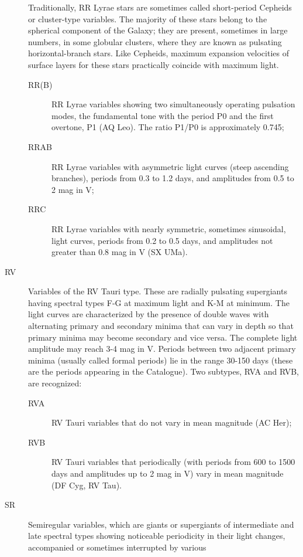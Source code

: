 \begin{description}
				Traditionally, RR Lyrae stars are sometimes called short-period Cepheids
				or cluster-type variables. The majority of these stars belong to the
				spherical component of the Galaxy; they are present, sometimes in large
				numbers, in some globular clusters, where they are known as pulsating
				horizontal-branch stars. Like Cepheids, maximum expansion velocities of
				surface layers for these stars practically coincide with maximum
				light.
	\begin{description}
\item[RR(B)] 	RR Lyrae variables showing two simultaneously operating
				pulsation modes, the fundamental tone with the period P0 and the first
				overtone, P1 (AQ Leo). The ratio P1/P0 is approximately 0.745;
\item[RRAB] 	RR Lyrae variables with asymmetric light curves (steep
				ascending branches), periods from 0.3 to 1.2 days, and amplitudes from
				0.5 to 2 mag in V;
\item[RRC]		RR Lyrae variables with nearly symmetric, sometimes
				sinusoidal, light curves, periods from 0.2 to 0.5 days, and amplitudes
				not greater than 0.8 mag in V (SX UMa).
	\end{description}
\item[RV]		Variables of the RV Tauri type. These are radially
				pulsating supergiants having spectral types F-G at maximum light and K-M
				at minimum. The light curves are characterized by the presence of double
				waves with alternating primary and secondary minima that can vary in
				depth so that primary minima may become secondary and vice versa. The
				complete light amplitude may reach 3-4 mag in V. Periods between two
				adjacent primary minima (usually called formal periods) lie in the range
				30-150 days (these are the periods appearing in the Catalogue). Two
				subtypes, RVA and RVB, are recognized:
	\begin{description}
\item[RVA]		RV Tauri variables that do not vary in mean magnitude (AC Her);
\item[RVB]		RV Tauri variables that periodically (with periods from 600
				to 1500 days and amplitudes up to 2 mag in V) vary in mean magnitude (DF
				Cyg, RV Tau).
	\end{description}
\item[SR]		Semiregular variables, which are giants or supergiants of
				intermediate and late spectral types showing noticeable periodicity in
				their light changes, accompanied or sometimes interrupted by various

\end{description}

